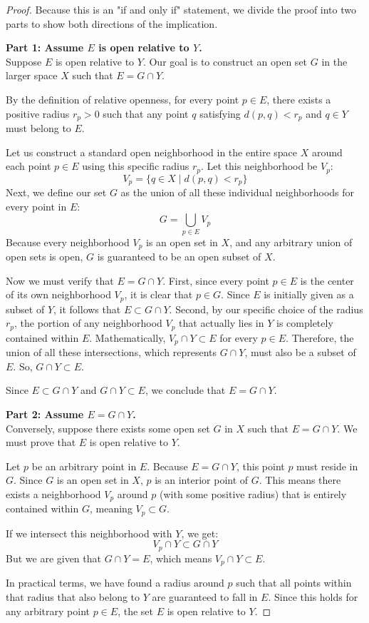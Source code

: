 \documentclass{article}
\theoremstyle{mythm}
\begin{document}
\begin{proof}
Because this is an "if and only if" statement, we divide the proof into two parts to show both directions of the implication.

\textbf{Part 1: Assume $E$ is open relative to $Y$.} \\
Suppose $E$ is open relative to $Y$. Our goal is to construct an open set $G$ in the larger space $X$ such that $E = G \cap Y$.

By the definition of relative openness, for every point $p \in E$, there exists a positive radius $r_p > 0$ such that any point $q$ satisfying $d(p, q) < r_p$ and $q \in Y$ must belong to $E$. 

Let us construct a standard open neighborhood in the entire space $X$ around each point $p \in E$ using this specific radius $r_p$. Let this neighborhood be $V_p$:
\[ V_p = \{ q \in X \mid d(p, q) < r_p \} \]
Next, we define our set $G$ as the union of all these individual neighborhoods for every point in $E$:
\[ G = \bigcup_{p \in E} V_p \]
Because every neighborhood $V_p$ is an open set in $X$, and any arbitrary union of open sets is open, $G$ is guaranteed to be an open subset of $X$.

Now we must verify that $E = G \cap Y$. 
First, since every point $p \in E$ is the center of its own neighborhood $V_p$, it is clear that $p \in G$. Since $E$ is initially given as a subset of $Y$, it follows that $E \subset G \cap Y$.
Second, by our specific choice of the radius $r_p$, the portion of any neighborhood $V_p$ that actually lies in $Y$ is completely contained within $E$. Mathematically, $V_p \cap Y \subset E$ for every $p \in E$. Therefore, the union of all these intersections, which represents $G \cap Y$, must also be a subset of $E$. So, $G \cap Y \subset E$.

Since $E \subset G \cap Y$ and $G \cap Y \subset E$, we conclude that $E = G \cap Y$.

\textbf{Part 2: Assume $E = G \cap Y$.} \\
Conversely, suppose there exists some open set $G$ in $X$ such that $E = G \cap Y$. We must prove that $E$ is open relative to $Y$.

Let $p$ be an arbitrary point in $E$. Because $E = G \cap Y$, this point $p$ must reside in $G$. Since $G$ is an open set in $X$, $p$ is an interior point of $G$. This means there exists a neighborhood $V_p$ around $p$ (with some positive radius) that is entirely contained within $G$, meaning $V_p \subset G$.

If we intersect this neighborhood with $Y$, we get:
\[ V_p \cap Y \subset G \cap Y \]
But we are given that $G \cap Y = E$, which means $V_p \cap Y \subset E$. 

In practical terms, we have found a radius around $p$ such that all points within that radius that also belong to $Y$ are guaranteed to fall in $E$. Since this holds for any arbitrary point $p \in E$, the set $E$ is open relative to $Y$.
\end{proof}
\end{document}
